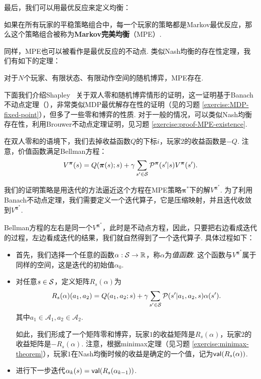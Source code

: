 最后，我们可以用最优反应来定义均衡：

\begin{definition}
    如果在所有玩家的平稳策略组合中，每一个玩家的策略都是Markov最优反应，那么这个策略组合被称为\textbf{Markov完美均衡}（MPE）.
\end{definition}

同样，MPE也可以被看作是最优反应的不动点. 类似Nash均衡的存在性定理，我们有如下的定理：

\begin{theorem}[MPE存在性定理]\label{theorem:MPE-existence}
对于$N$个玩家、有限状态、有限动作空间的随机博弈，MPE存在.
\end{theorem}

下面我们介绍Shapley~\cite{shapleyStochasticGames1953} 关于双人零和随机博弈情形的证明，这一证明基于Banach不动点定理（），非常类似MDP最优解存在性的证明（见的习题 \ref{exercise:MDP-fixed-point}），但多了一些零和博弈的性质. 对于一般的情况，可以类似Nash均衡存在性，利用Brouwer不动点定理证明，见习题 \ref{exercise:proof-MPE-existence}.

在双人零和的语境下，我们去掉收益函数$Q$的下标$i$，玩家$2$的收益函数是$-Q$. 注意，价值函数满足Bellman方程：
    \[V^{\boldsymbol \pi}(s) = Q(\boldsymbol \pi(s);s) + \gamma \sum_{s'\in \mathcal S} \mathcal P^{\boldsymbol\pi}(s'|s)V^{\boldsymbol \pi}(s').\]

我们的证明策略是用迭代的方法逼近这个方程在MPE策略$\boldsymbol{\pi^*}$下的解$V^{\boldsymbol \pi^*}$. 为了利用Banach不动点定理，我们需要定义一个迭代算子，它是压缩映射，并且迭代收敛到$V^{\boldsymbol \pi^*}$. 

Bellman方程的左右是同一个$V^{\boldsymbol \pi^*}$，此时是不动点方程，因此，只要把右边看成迭代的过程，左边看成迭代的结果，我们就自然得到了一个迭代算子. 具体过程如下：
\begin{itemize}
    \item 首先，我们选择一个任意的函数$\alpha: \mathcal S\to \mathbb{R}$，称$\alpha$为\textit{值函数}. 这个函数与$V^{\boldsymbol \pi^*}$属于同样的空间，这是迭代的初始值$\alpha_0$.
    \item 对任意$s\in \mathcal S$，定义矩阵$R_s(\alpha)$为
    \[R_s(\alpha)(a_1,a_2) = Q(a_1,a_2;s) + \gamma \sum_{s'\in \mathcal S}\mathcal P(s'|a_1,a_2,s)\alpha(s').\]
    其中$a_1\in \mathcal A_1, a_2\in \mathcal A_2$.
    
    如此，我们形成了一个矩阵零和博弈，玩家$1$的收益矩阵是$R_s(\alpha)$，玩家$2$的收益矩阵是$-R_s(\alpha)$. 注意，根据minimax定理（见习题 \ref{exercise:minimax-theorem}），玩家$1$在Nash均衡时候的收益是确定的一个值，记为$\mathsf{val}(R_s(\alpha))$.
    \item 进行下一步迭代$\alpha_k(s)=\mathsf{val}(R_s(\alpha_{k-1}))$. 
\end{itemize}


